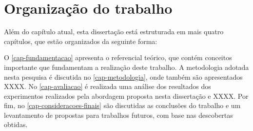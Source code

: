 \section{Organização do trabalho}
\label{organizacao-trabalho}

Além do capítulo atual, esta dissertação está estruturada em mais quatro capítulos, que estão organizados da seguinte forma:

O \autoref{cap-fundamentacao} apresenta o referencial teórico, que contém conceitos importante que fundamentam a realização deste trabalho. 
A metodologia adotada nesta pesquisa é discutida no \autoref{cap-metodologia}, onde também são apresentados XXXX. %
No \autoref{cap-avaliacao} é realizada uma análise dos resultados dos experimentos realizados pela abordagem proposta nesta dissertação e XXXX. %
Por fim, no \autoref{cap-consideracoes-finais} são discutidas as conclusões do trabalho e um levantamento de propostas para trabalhos futuros, com base nas descobertas obtidas.


